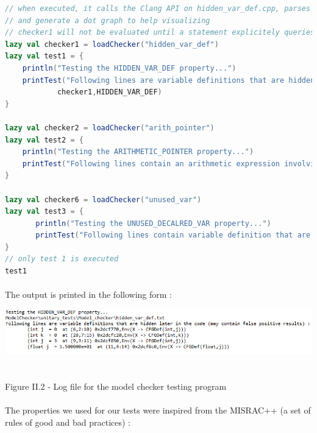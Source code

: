 \documentclass{report}
\begin{document}
\begin{lstlisting}[language=scala]
// when executed, it calls the Clang API on hidden_var_def.cpp, parses the AST file, convert it into a CFG,
// and generate a dot graph to help visualizing
// checker1 will not be evaluated until a statement explicitely queries its value
lazy val checker1 = loadChecker("hidden_var_def")
lazy val test1 = {
	println("Testing the HIDDEN_VAR_DEF property...")
	printTest("Following lines are variable definitions that are hidden later in the code (may contain false positive results) :",
			checker1,HIDDEN_VAR_DEF)
}
	
lazy val checker2 = loadChecker("arith_pointer")
lazy val test2 = {
	println("Testing the ARITHMETIC_POINTER property...")
	printTest("Following lines contain an arithmetic expression involving a pointer :",checker2,ARITHMETIC_POINTER)
}

lazy val checker6 = loadChecker("unused_var")
lazy val test3 = {
       println("Testing the UNUSED_DECALRED_VAR property...")
       printTest("Following lines contain variable definition that are not used :",checker3,UNUSED_DECALRED_VAR)
}
// only test 1 is executed
test1
\end{lstlisting}
\paragraph{}
\hspace{4mm}The output is printed in the following form :

\begin{center}
\includegraphics[scale=0.8]{data/test-log2}
~\\~\\Figure II.2 - Log file for the model checker testing program
\end{center}

\paragraph{}
\hspace{4mm}The properties we used for our tests were inspired from the MISRAC++ (a set of rules of good and bad practices) :
\end{document}
